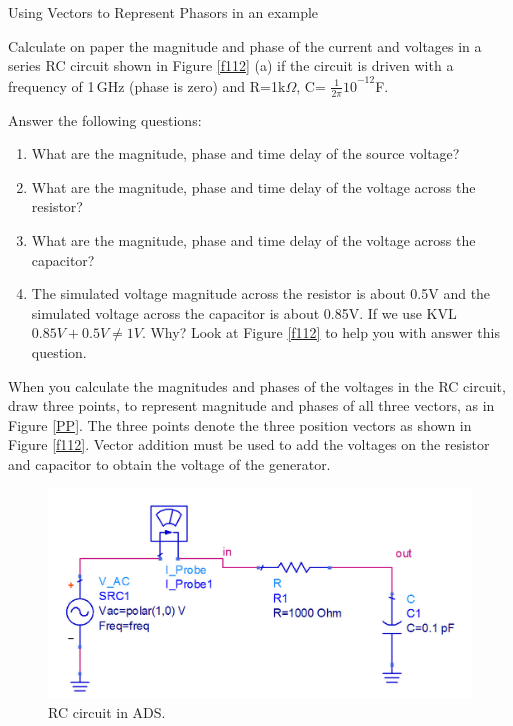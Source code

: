 \documentclass{ximera}
\begin{document}
\begin{example}
Using Vectors to Represent Phasors in an example


 Calculate on paper the magnitude  and phase of the current and voltages in a series RC circuit shown in Figure \ref{f112} (a) if the circuit is driven with a frequency of 1\,GHz (phase is zero) and R=1k$\Omega $, C= ${\frac{1}{2\pi }10}^{-12}$F. 
 
 
 Answer the following questions:

\begin{enumerate}
\item  What are the magnitude, phase and time delay of the source voltage?

\item  What are the magnitude, phase and time delay of the voltage across the resistor?

\item  What are the magnitude, phase and time delay of the voltage across the capacitor?

\item  The simulated voltage magnitude across the resistor is about 0.5V and the simulated voltage across the capacitor is about 0.85V.  If we use KVL $ 0.85V+0.5V \neq 1V$. Why? Look at Figure \ref{f112} to help you with answer this question.

\end{enumerate}
\begin{explanation} 
 
 
  When you calculate the magnitudes and phases of the voltages in the RC circuit, draw three points, to represent magnitude and phases of all three vectors, as in Figure \ref{PP}. The three points denote the three position vectors as shown in Figure \ref{f112}. Vector addition must be used to add the voltages on the resistor and capacitor to obtain the voltage of the generator. 






\begin{figure}[htbp]
\begin{center}
\includegraphics[scale=0.2]{../jpg/RCcircADS.jpg}
\end{center}
\caption{\label{RCcircADS} RC circuit in ADS.}
\end{figure}



\end{explanation}
\end{example}
\end{document}
